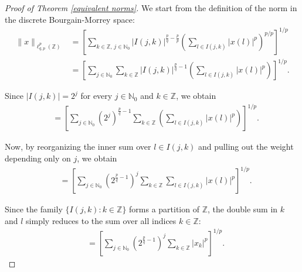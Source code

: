 \documentclass[preprint,12pt]{elsarticle}
\begin{document}
\begin{proof}[Proof of Theorem \ref{equivalent norms}]
We start from the definition of the norm in the discrete Bourgain-Morrey space:
\begin{equation*}
     \begin{split}
     \| x\| _{\ell_{q,p}^{p}(\mathbb{Z})}&=   \left[\sum\limits_{k\in\mathbb{Z},\,j\in\mathbb{N}_{0}}
\left\vert I\left(  j,k\right)  \right\vert ^{\frac{p}{q}-\frac{p}{p}}\left(
\sum\limits_{l\in I\left(  j,k\right)  }
\left\vert x(l)\right\vert ^{p}\right)  ^{p/p}\right]  ^{1/p}\\
&= \left[\sum\limits_{j\in\mathbb{N}_{0}}\sum_{k\in\mathbb{Z}}
\left\vert I\left(  j,k\right)  \right\vert ^{\frac{p}{q}-1}\left(
\sum\limits_{l\in I\left(  j,k\right)  }
\left\vert x(l)\right\vert ^{p}\right) \right]  ^{1/p}.
     \end{split}
\end{equation*}

Since $\left| I(j,k)\right| = 2^{j}$ for every $j\in\mathbb{N}_{0}$ and $k\in\mathbb{Z}$, we obtain
\begin{equation*}
     \begin{split}
&=\left[\sum\limits_{j\in\mathbb{N}_{0}}
\left(2^{j}\right) ^{\frac{p}{q}-1}\sum_{k\in\mathbb{Z}}\left(
\sum\limits_{l\in I\left(  j,k\right)  }
\left\vert x(l)\right\vert ^{p}\right) \right]  ^{1/p}.
     \end{split}
\end{equation*}

Now, by reorganizing the inner sum over $l\in I(j,k)$ and pulling out the weight depending only on $j$, we obtain
\begin{equation*}
     \begin{split}
&=\left[\sum\limits_{j\in\mathbb{N}_{0}}
\left(2 ^{\frac{p}{q}-1}\right)^{j}\sum_{k\in\mathbb{Z}}
\sum\limits_{l\in I\left(  j,k\right)  }
\left\vert x(l)\right\vert ^{p} \right]  ^{1/p}.
     \end{split}
\end{equation*}

Since the family $\{I(j,k):k\in\mathbb{Z}\}$ forms a partition of $\mathbb{Z}$, the double sum in $k$ and $l$ simply reduces to the sum over all indices $k\in\mathbb{Z}$:
\begin{equation*}
     \begin{split}
&=\left[\sum\limits_{j\in\mathbb{N}_{0}}
\left(2 ^{\frac{p}{q}-1}\right)^{j}\sum_{k\in\mathbb{Z}}
\left\vert x_{k}\right\vert ^{p} \right]  ^{1/p}.
     \end{split}
\end{equation*}


\end{proof}
\end{document}
